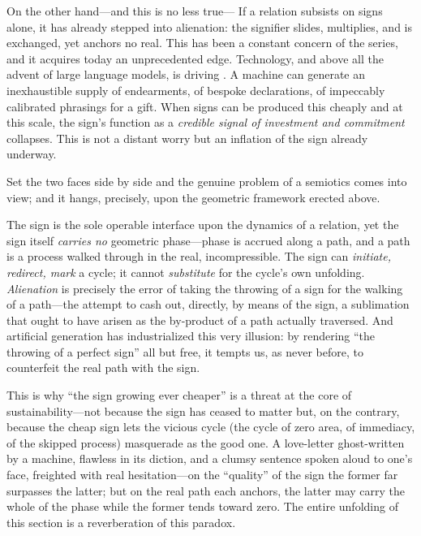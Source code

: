 On the other hand---and this is no less true--- If a relation subsists on signs alone, it has already stepped into alienation: the signifier slides, multiplies, and is exchanged, yet anchors no real. This has been a constant concern of the series, and it acquires today an unprecedented edge. Technology, and above all the advent of large language models, is driving . A machine can generate an inexhaustible supply of endearments, of bespoke declarations, of impeccably calibrated phrasings for a gift. When signs can be produced this cheaply and at this scale, the sign's function as a \emph{credible signal of investment and commitment} collapses. This is not a distant worry but an inflation of the sign already underway.

Set the two faces side by side and the genuine problem of a semiotics comes into view; and it hangs, precisely, upon the geometric framework erected above.

\begin{claim}
The sign is the sole operable interface upon the dynamics of a relation, yet the sign itself \emph{carries no} geometric phase---phase is accrued along a path, and a path is a process walked through in the real, incompressible. The sign can \emph{initiate, redirect, mark} a cycle; it cannot \emph{substitute} for the cycle's own unfolding. \emph{Alienation} is precisely the error of taking the throwing of a sign for the walking of a path---the attempt to cash out, directly, by means of the sign, a sublimation that ought to have arisen as the by-product of a path actually traversed. And artificial generation has industrialized this very illusion: by rendering ``the throwing of a perfect sign'' all but free, it tempts us, as never before, to counterfeit the real path with the sign.
\end{claim}

This is why ``the sign growing ever cheaper'' is a threat at the core of sustainability---not because the sign has ceased to matter but, on the contrary, because the cheap sign lets the vicious cycle (the cycle of zero area, of immediacy, of the skipped process) masquerade as the good one. A love-letter ghost-written by a machine, flawless in its diction, and a clumsy sentence spoken aloud to one's face, freighted with real hesitation---on the ``quality'' of the sign the former far surpasses the latter; but on the real path each anchors, the latter may carry the whole of the phase while the former tends toward zero. The entire unfolding of this section is a reverberation of this paradox.

